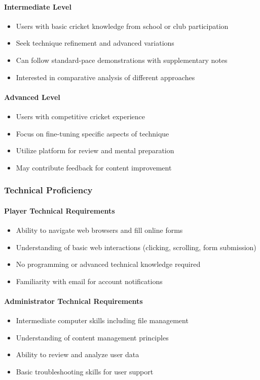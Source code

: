\documentclass[12pt,a4paper]{article}
\begin{document}
\begin{enumerate}
\paragraph{Intermediate Level}
\begin{itemize}
    \item Users with basic cricket knowledge from school or club participation
    \item Seek technique refinement and advanced variations
    \item Can follow standard-pace demonstrations with supplementary notes
    \item Interested in comparative analysis of different approaches
\end{itemize}

\paragraph{Advanced Level}
\begin{itemize}
    \item Users with competitive cricket experience
    \item Focus on fine-tuning specific aspects of technique
    \item Utilize platform for review and mental preparation
    \item May contribute feedback for content improvement
\end{itemize}

\subsubsection{Technical Proficiency}
\paragraph{Player Technical Requirements}
\begin{itemize}
    \item Ability to navigate web browsers and fill online forms
    \item Understanding of basic web interactions (clicking, scrolling, form submission)
    \item No programming or advanced technical knowledge required
    \item Familiarity with email for account notifications
\end{itemize}

\paragraph{Administrator Technical Requirements}
\begin{itemize}
    \item Intermediate computer skills including file management
    \item Understanding of content management principles
    \item Ability to review and analyze user data
    \item Basic troubleshooting skills for user support
\end{itemize}


\end{enumerate}
\end{document}
